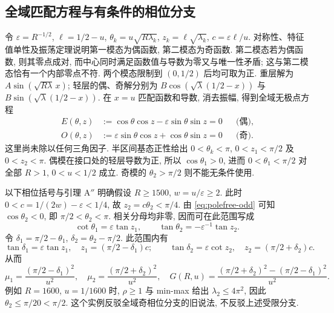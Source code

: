 \subsection{全域匹配方程与有条件的相位分支}\label{sec:global-phase}
令 $\varepsilon=R^{-1/2}$, $\ell=1/2-u$, $\theta_k=u\sqrt{R\lambda_k}$,
$z_k=\ell\sqrt{\lambda_k}$, $c=\varepsilon\ell/u$.
对称性、特征值单性及振荡定理说明第一模态为偶函数, 第二模态为奇函数.
第二模态若为偶函数, 则其零点成对, 而中心同时满足函数值与导数为零又与唯一性矛盾;
这与第二模态恰有一个内部零点不符. 两个模态限制到 $(0,1/2)$ 后均可取为正.
重层解为 $A\sin(\sqrt{R\lambda}\,x)$; 轻层的偶、奇解分别为
$B\cos(\sqrt\lambda(1/2-x))$ 与 $B\sin(\sqrt\lambda(1/2-x))$.
在 $x=u$ 匹配函数和导数, 消去振幅, 得到全域无极点方程
\begin{align}
 E(\theta,z)&:=\cos\theta\cos z-\varepsilon\sin\theta\sin z=0
 &&\text{(偶)},\label{eq:polefree-even}\\
 O(\theta,z)&:=\varepsilon\sin\theta\cos z+\cos\theta\sin z=0
 &&\text{(奇)}.\label{eq:polefree-odd}
\end{align}
这里尚未除以任何三角因子. 半区间基态正性给出
$0<\theta_k<\pi$, $0<z_1<\pi/2$ 及 $0<z_2<\pi$.
偶模在接口处的轻层导数为正, 所以 $\cos\theta_1>0$,
进而 $0<\theta_1<\pi/2$ 对全部 $R>1$, $0<u<1/2$ 成立.
奇模的 $\theta_2>\pi/2$ 则不能无条件使用.

以下相位括号与引理 A$''$ 明确假设 $R\ge1500$, $w=u/\varepsilon\ge2$.
此时 $0<c=1/(2w)-\varepsilon<1/4$, 故 $z_2=c\theta_2<\pi/4$.
由 \eqref{eq:polefree-odd} 可知 $\cos\theta_2<0$, 即
$\pi/2<\theta_2<\pi$. 相关分母均非零, 因而可在此范围写成
\begin{equation}
 \cot\theta_1=\varepsilon\tan z_1,\qquad
 \tan\theta_2=-\varepsilon^{-1}\tan z_2.\label{eq:secular}
\end{equation}
令 $\delta_1=\pi/2-\theta_1$, $\delta_2=\theta_2-\pi/2$. 此范围内有
\begin{equation}
 \tan\delta_1=\varepsilon\tan z_1,\quad
 z_1=(\pi/2-\delta_1)c;\qquad
 \tan\delta_2=\varepsilon\cot z_2,\quad
 z_2=(\pi/2+\delta_2)c.\label{eq:delta}
\end{equation}
从而
\begin{equation}
 \mu_1=\frac{(\pi/2-\delta_1)^2}{u^2},\quad
 \mu_2=\frac{(\pi/2+\delta_2)^2}{u^2},\quad
 G(R,u)=\frac{(\pi/2+\delta_2)^2-(\pi/2-\delta_1)^2}{u^2}.\label{eq:mu}
\end{equation}
例如 $R=1600$, $u=1/1600$ 时, $\rho\ge1$ 与 min-max 给出
$\lambda_2\le4\pi^2$, 因此 $\theta_2\le\pi/20<\pi/2$.
这个实例反驳全域奇相位分支的旧说法, 不反驳上述受限分支.


